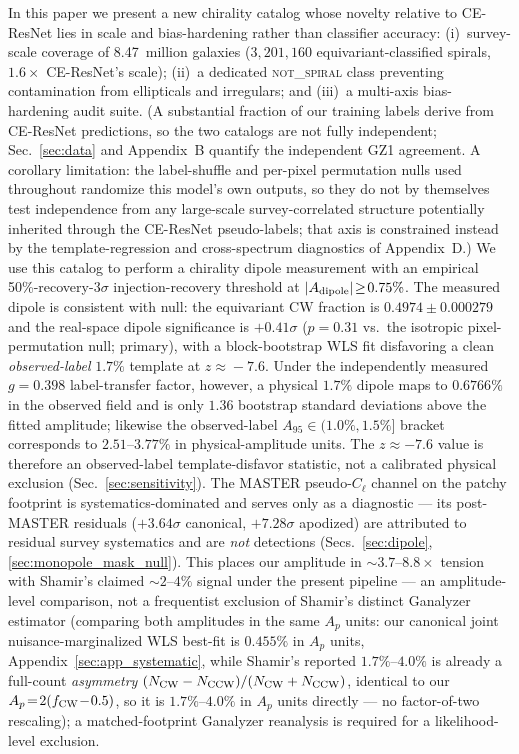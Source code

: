 \documentclass[aps,prd,twocolumn,superscriptaddress,preprintnumbers,nofootinbib,longbibliography,floatfix]{revtex4-2}
\newcommand{\NS}{\textsc{not\_spiral}}
\newcommand{\sigmaunit}{\sigma}
\begin{document}
In this paper we present a new chirality catalog whose novelty relative to CE-ResNet lies in scale and bias-hardening rather than classifier accuracy: (i)~survey-scale coverage of 8.47~million galaxies ($3{,}201{,}160$ equivariant-classified spirals, $1.6\times$ CE-ResNet's scale); (ii)~a dedicated \NS{} class preventing contamination from ellipticals and irregulars; and (iii)~a multi-axis bias-hardening audit suite. (A substantial fraction of our training labels derive from CE-ResNet predictions, so the two catalogs are not fully independent; Sec.~\ref{sec:data} and Appendix~B quantify the independent GZ1 agreement. A corollary limitation: the label-shuffle and per-pixel permutation nulls used throughout randomize this model's own outputs, so they do not by themselves test independence from any large-scale survey-correlated structure potentially inherited through the CE-ResNet pseudo-labels; that axis is constrained instead by the template-regression and cross-spectrum diagnostics of Appendix~D.) We use this catalog to perform a chirality dipole measurement with an empirical 50\%-recovery-$3\sigma$ injection-recovery threshold at $|A_{\rm dipole}|\!\geq\!0.75\%$. The measured dipole is consistent with null: the equivariant CW fraction is $0.4974 \pm 0.000279$ and the real-space dipole significance is $+0.41\sigmaunit$ ($p\!=\!0.31$ vs.\ the isotropic pixel-permutation null; primary), with a block-bootstrap WLS fit disfavoring a clean \emph{observed-label} $1.7\%$ template at $z\!\approx\!-7.6$. Under the independently measured $g=0.398$ label-transfer factor, however, a physical $1.7\%$ dipole maps to $0.6766\%$ in the observed field and is only $1.36$ bootstrap standard deviations above the fitted amplitude; likewise the observed-label $A_{95}\!\in\!(1.0\%,1.5\%]$ bracket corresponds to $2.51$--$3.77\%$ in physical-amplitude units. The $z\approx-7.6$ value is therefore an observed-label template-disfavor statistic, not a calibrated physical exclusion (Sec.~\ref{sec:sensitivity}). The MASTER pseudo-$C_\ell$ channel on the patchy footprint is systematics-dominated and serves only as a diagnostic --- its post-MASTER residuals ($+3.64\sigmaunit$ canonical, $+7.28\sigmaunit$ apodized) are attributed to residual survey systematics and are \emph{not} detections (Secs.~\ref{sec:dipole}, \ref{sec:monopole_mask_null}). This places our amplitude in $\sim\!3.7$--$8.8\times$ tension with Shamir's claimed $\sim\!2$--$4\%$ signal under the present pipeline --- an amplitude-level comparison, not a frequentist exclusion of Shamir's distinct Ganalyzer estimator (comparing both amplitudes in the same $A_p$ units: our canonical joint nuisance-marginalized WLS best-fit is $0.455\%$ in $A_p$ units, Appendix~\ref{sec:app_systematic}, while Shamir's reported $1.7\%$--$4.0\%$ is already a full-count \emph{asymmetry} $(N_{\rm CW}-N_{\rm CCW})/(N_{\rm CW}+N_{\rm CCW})$, identical to our $A_p\!=\!2(f_{\rm CW}\!-\!0.5)$, so it is $1.7\%$--$4.0\%$ in $A_p$ units directly --- no factor-of-two rescaling); a matched-footprint Ganalyzer reanalysis is required for a likelihood-level exclusion.
\end{document}
